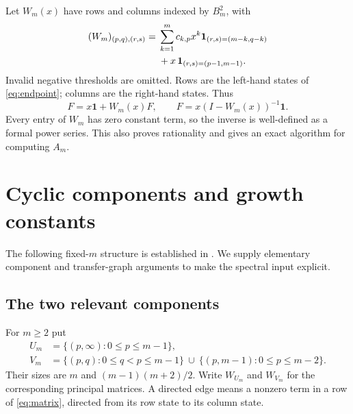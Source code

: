 \documentclass[11pt,a4paper]{article}
\theoremstyle{definition}\newaliascnt{definition}{theorem}
\theoremstyle{remark}\newaliascnt{remark}{theorem}
\newcommand{\one}{\mathbf 1}
\begin{document}
Let $W_m(x)$ have rows and columns indexed by $B_m^2$, with
\begin{align}
 (W_m)_{(p,q),(r,s)}={}&
  \sum_{k=1}^m c_{k,p}x^k
       \mathbf1_{(r,s)=(m-k,q-k)}\notag\\
 &+x\,\mathbf1_{(r,s)=(p-1,m-1)}.
 \label{eq:matrix}
\end{align}
Invalid negative thresholds are omitted. Rows are the left-hand states of
\eqref{eq:endpoint}; columns are the right-hand states. Thus
\begin{equation}
 F=x\one+W_m(x)F,
 \qquad F=x(I-W_m(x))^{-1}\one.
 \label{eq:matrix-system}
\end{equation}
Every entry of $W_m$ has zero constant term, so the inverse is well-defined
as a formal power series. This also proves rationality and gives an exact
algorithm for computing $A_m$.

\section{Cyclic components and growth constants}
\label{sec:components}
The following fixed-$m$ structure is established in
\cite[Proposition~2.7 and Theorem~4.12]{MayamaAkita}. We supply elementary
component and transfer-graph arguments to make the spectral input explicit.

\subsection{The two relevant components}
For $m\ge2$ put
\begin{align}
 U_m&=\{(p,\infty):0\le p\le m-1\},\label{eq:U}\\
 V_m&=\{(p,q):0\le q<p\le m-1\}
       \ \cup\ \{(p,m-1):0\le p\le m-2\}.
       \label{eq:V}
\end{align}
Their sizes are $m$ and $(m-1)(m+2)/2$. Write $W_{U_m}$ and $W_{V_m}$ for the
corresponding principal matrices. A directed edge means a nonzero term in a
row of \eqref{eq:matrix}, directed from its row state to its column state.
\end{document}
